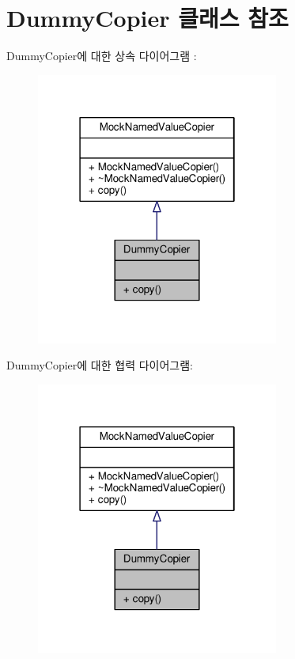 \hypertarget{class_dummy_copier}{}\section{Dummy\+Copier 클래스 참조}
\label{class_dummy_copier}


Dummy\+Copier에 대한 상속 다이어그램 \+: 
\nopagebreak
\begin{figure}[H]
\begin{center}
\leavevmode
\includegraphics[width=226pt]{class_dummy_copier__inherit__graph}
\end{center}
\end{figure}


Dummy\+Copier에 대한 협력 다이어그램\+:
\nopagebreak
\begin{figure}[H]
\begin{center}
\leavevmode
\includegraphics[width=226pt]{class_dummy_copier__coll__graph}
\end{center}
\end{figure}
